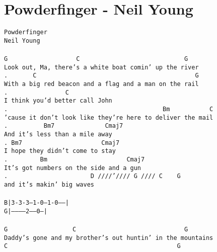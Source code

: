 \newpage
\section{Powderfinger - Neil Young}
\label{Powderfinger - Neil Young}
\texttt{Powderfinger\\
Neil\ Young\\
\\
G\ \ \ \ \ \ \ \ \ \ \ \ \ \ \ \ \ \ \ C\ \ \ \ \ \ \ \ \ \ \ \ \ \ \ \ \ \ \ \ \ \ \ \ \ \ \ \ \ G\\
Look\ out,\ Ma,\ there's\ a\ white\ boat\ comin'\ up\ the\ river\\
. \ \ \ \ \ \ C\ \ \ \ \ \ \ \ \ \ \ \ \ \ \ \ \ \ \ \ \ \ \ \ \ \ \ \ \ \ \ \ \ \ \ \ \ \ \ \ \ \ \ \ G\\
With\ a\ big\ red\ beacon\ and\ a\ flag\ and\ a\ man\ on\ the\ rail\\
. \ \ \ \ \ \ \ \ \ \ \ \ \ \ \ C\\
I\ think\ you'd\ better\ call\ John\\
. \ \ \ \ \ \ \ \ \ \ \ \ \ \ \ \ \ \ \ \ \ \ \ \ \ \ \ \ \ \ \ \ \ \ \ \ \ \ \ \ \ \ Bm\ \ \ \ \ \ \ \ \ \ \ C\\
'cause\ it\ don't\ look\ like\ they're\ here\ to\ deliver\ the\ mail\\
. \ \ \ \ \ \ \ \ \ Bm7\ \ \ \ \ \ \ \ \ \ \ \ \ \ Cmaj7\\
And\ it's\ less\ than\ a\ mile\ away\\
. Bm7\ \ \ \ \ \ \ \ \ \ \ \ \ \ \ \ \ \ \ \ \ \ Cmaj7\\
I\ hope\ they\ didn't\ come\ to\ stay\\
. \ \ \ \ \ \ \ \ Bm\ \ \ \ \ \ \ \ \ \ \ \ \ \ \ \ \ \ \ \ \ \ Cmaj7\\
It's\ got\ numbers\ on\ the\ side\ and\ a\ gun\\
. \ \ \ \ \ \ \ \ \ \ \ \ \ \ \ \ \ \ \ \ \ \ D\ ////'////\ G\ ////\ C\ \ \ \ G\\
and\ it's\ makin'\ big\ waves\\
\\
B|3-3-3--1-0---1-0-----|\\
G|-----------2-----0---|\\
\\
G\ \ \ \ \ \ \ \ \ \ \ \ \ \ \ \ \ \ C\ \ \ \ \ \ \ \ \ \ \ \ \ \ \ \ \ \ \ \ \ \ \ \ \ \ \ \ \ \ G\\
Daddy's\ gone\ and\ my\ brother's\ out\ huntin'\ in\ the\ mountains\\
C\ \ \ \ \ \ \ \ \ \ \ \ \ \ \ \ \ \ \ \ \ \ \ \ \ \ \ \ \ \ \ \ \ \ \ \ \ \ \ \ \ \ \ \ \ \ \ G\\
}
